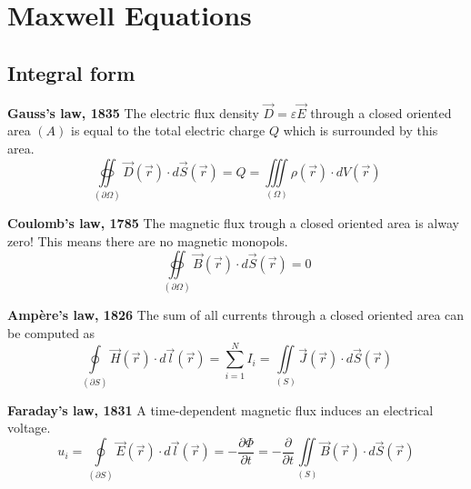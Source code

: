 \section{Maxwell Equations}

\subsection{Integral form}
\begin{multicols}{2}
	\textbf{Gauss's law, 1835\newline}
	\noindent The electric flux density $\vec{D} = \varepsilon \vec{E}$ through a closed oriented area $(A)$ is equal to the total electric charge $Q$ which is surrounded by this area.
	\begin{equation}
		\oiint\limits_{\left(\partial\Omega\right)} \vec{D}\left(\vec{r}\right)\cdot d\vec{S}\left(\vec{r}\right) = Q = \iiint\limits_{\left(\Omega\right)}\rho\left(\vec{r}\right)\cdot dV\left(\vec{r}\right)
		\label{eq:MaxwellInt1}
	\end{equation}
	
	\textbf{Coulomb's law, 1785\newline}
	\noindent The magnetic flux trough a closed oriented area is alway zero! This means there are no magnetic monopols.
	\begin{equation}
		\oiint\limits_{\left(\partial\Omega\right)} \vec{B}\left(\vec{r}\right)\cdot d\vec{S}\left(\vec{r}\right) = 0
		\label{eq:MaxwellInt2}
	\end{equation}
	
	\textbf{Ampère's law, 1826\newline}
	The sum of all currents through a closed oriented area can be computed as
	\begin{equation}
		\oint\limits_{\left(\partial S\right)} \vec{H}\left(\vec{r}\right)\cdot d\vec{l}\left(\vec{r}\right) = \sum_{i=1}^{N} I_i = \iint\limits_{\left(S\right)}\vec{J}\left(\vec{r}\right)\cdot d\vec{S}\left(\vec{r}\right)
		\label{eq:MaxwellInt3}
	\end{equation}
	
	\textbf{Faraday's law, 1831\newline}
	A time-dependent magnetic flux induces an electrical voltage.
	\begin{equation}
		u_i = \oint\limits_{\left(\partial S\right)} \vec{E}\left(\vec{r}\right)\cdot d\vec{l}\left(\vec{r}\right) = -\frac{\partial \Phi}{\partial t} = -\frac{\partial}{\partial t} \iint\limits_{\left(S\right)} \vec{B}\left(\vec{r}\right)\cdot d\vec{S}\left(\vec{r}\right)
		\label{eq:MaxwellInt4} 
	\end{equation}
\end{multicols}

